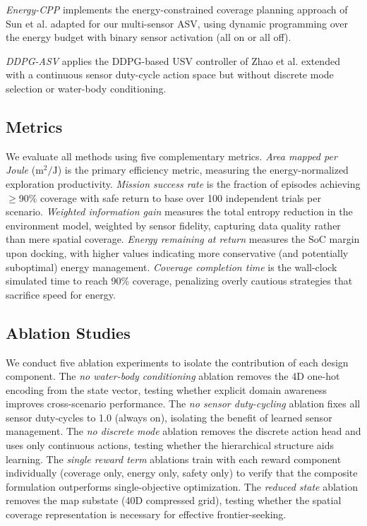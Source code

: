 \documentclass[conference]{IEEEtran}
\begin{document}
\textit{Energy-CPP} implements the energy-constrained coverage planning approach of Sun et al. \cite{Sun2025EnergyCPP} adapted for our multi-sensor ASV, using dynamic programming over the energy budget with binary sensor activation (all on or all off).

\textit{DDPG-ASV} applies the DDPG-based USV controller of Zhao et al. \cite{Zhao2022DDPGASV} extended with a continuous sensor duty-cycle action space but without discrete mode selection or water-body conditioning.


\subsection{Metrics}

We evaluate all methods using five complementary metrics.
\textit{Area mapped per Joule} ($\text{m}^2/\text{J}$) is the primary efficiency metric, measuring the energy-normalized exploration productivity. \textit{Mission success rate} is the fraction of episodes achieving $\geq$90\% coverage with safe return to base over 100 independent trials per scenario. \textit{Weighted information gain} measures the total entropy reduction in the environment model, weighted by sensor fidelity, capturing data quality rather than mere spatial coverage. \textit{Energy remaining at return} measures the SoC margin upon docking, with higher values indicating more conservative (and potentially suboptimal) energy management. \textit{Coverage completion time} is the wall-clock simulated time to reach 90\% coverage, penalizing overly cautious strategies that sacrifice speed for energy.


\subsection{Ablation Studies}

We conduct five ablation experiments to isolate the contribution of each design component.
The \textit{no water-body conditioning} ablation removes the 4D one-hot encoding from the state vector, testing whether explicit domain awareness improves cross-scenario performance. The \textit{no sensor duty-cycling} ablation fixes all sensor duty-cycles to 1.0 (always on), isolating the benefit of learned sensor management. The \textit{no discrete mode} ablation removes the discrete action head and uses only continuous actions, testing whether the hierarchical structure aids learning. The \textit{single reward term} ablations train with each reward component individually (coverage only, energy only, safety only) to verify that the composite formulation outperforms single-objective optimization. The \textit{reduced state} ablation removes the map substate (40D compressed grid), testing whether the spatial coverage representation is necessary for effective frontier-seeking.
\end{document}

